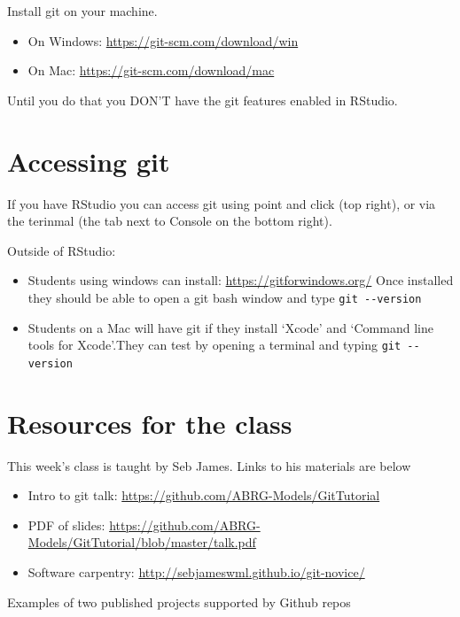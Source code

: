 \documentclass[
]{book}
\providecommand{\tightlist}{%
  \setlength{\itemsep}{0pt}\setlength{\parskip}{0pt}}
\begin{document}
Install git on your machine.

\begin{itemize}
\tightlist
\item
  On Windows: \url{https://git-scm.com/download/win}
\item
  On Mac: \url{https://git-scm.com/download/mac}
\end{itemize}

Until you do that you DON'T have the git features enabled in RStudio.

\hypertarget{accessing-git}{%
\section{Accessing git}\label{accessing-git}}

If you have RStudio you can access git using point and click (top right), or via the terinmal (the tab next to Console on the bottom right).

Outside of RStudio:

\begin{itemize}
\tightlist
\item
  Students using windows can install: \url{https://gitforwindows.org/} Once installed they should be able to open a git bash window and type \texttt{git\ -\/-version}
\item
  Students on a Mac will have git if they install `Xcode' and `Command line tools for Xcode'.They can test by opening a terminal and typing \texttt{git\ -\/-version}
\end{itemize}

\hypertarget{resources-for-the-class}{%
\section{Resources for the class}\label{resources-for-the-class}}

This week's class is taught by Seb James. Links to his materials are below

\begin{itemize}
\tightlist
\item
  Intro to git talk: \url{https://github.com/ABRG-Models/GitTutorial}
\item
  PDF of slides: \url{https://github.com/ABRG-Models/GitTutorial/blob/master/talk.pdf}
\item
  Software carpentry: \url{http://sebjameswml.github.io/git-novice/}
\end{itemize}

Examples of two published projects supported by Github repos
\end{document}
